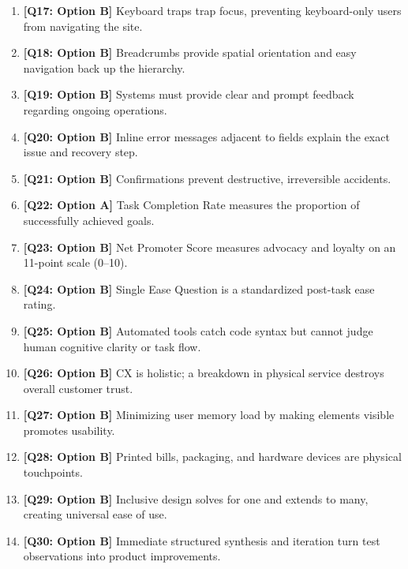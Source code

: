 \begin{expbox}
\begin{enumerate}[leftmargin=6mm, itemsep=2.5mm]
  \item \textbf{[Q17: Option B]} Keyboard traps trap focus, preventing keyboard-only users from navigating the site.
  \item \textbf{[Q18: Option B]} Breadcrumbs provide spatial orientation and easy navigation back up the hierarchy.
  \item \textbf{[Q19: Option B]} Systems must provide clear and prompt feedback regarding ongoing operations.
  \item \textbf{[Q20: Option B]} Inline error messages adjacent to fields explain the exact issue and recovery step.
  \item \textbf{[Q21: Option B]} Confirmations prevent destructive, irreversible accidents.
  \item \textbf{[Q22: Option A]} Task Completion Rate measures the proportion of successfully achieved goals.
  \item \textbf{[Q23: Option B]} Net Promoter Score measures advocacy and loyalty on an 11-point scale (0–10).
  \item \textbf{[Q24: Option B]} Single Ease Question is a standardized post-task ease rating.
  \item \textbf{[Q25: Option B]} Automated tools catch code syntax but cannot judge human cognitive clarity or task flow.
  \item \textbf{[Q26: Option B]} CX is holistic; a breakdown in physical service destroys overall customer trust.
  \item \textbf{[Q27: Option B]} Minimizing user memory load by making elements visible promotes usability.
  \item \textbf{[Q28: Option B]} Printed bills, packaging, and hardware devices are physical touchpoints.
  \item \textbf{[Q29: Option B]} Inclusive design solves for one and extends to many, creating universal ease of use.
  \item \textbf{[Q30: Option B]} Immediate structured synthesis and iteration turn test observations into product improvements.
\end{enumerate}
\end{expbox}
